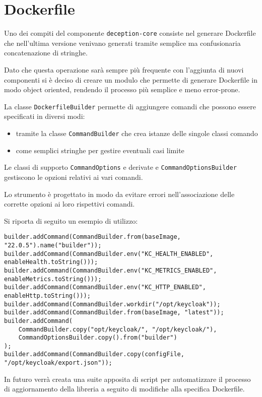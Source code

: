 \section{Dockerfile}

Uno dei compiti del componente \texttt{deception-core} consiste nel generare Dockerfile che nell'ultima versione venivano generati tramite semplice ma confusionaria concatenazione di stringhe.

Dato che questa operazione sarà sempre più frequente con l'aggiunta di nuovi componenti si è deciso di creare un modulo che permette di generare Dockerfile in modo object oriented, rendendo il processo più semplice e meno error-prone.

La classe \texttt{DockerfileBuilder} permette di aggiungere comandi che possono essere specificati in diversi modi:
\begin{itemize}
    \item tramite la classe \texttt{CommandBuilder} che crea istanze delle singole classi comando
    \item come semplici stringhe per gestire eventuali casi limite
\end{itemize}

Le classi di supporto \texttt{CommandOptions} e derivate e \texttt{CommandOptionsBuilder} gestiscono le opzioni relativi ai vari comandi.

Lo strumento è progettato in modo da evitare errori nell'associazione delle corrette opzioni ai loro rispettivi comandi.

Si riporta di seguito un esempio di utilizzo:
\begin{verbatim}
builder.addCommand(CommandBuilder.from(baseImage, "22.0.5").name("builder"));
builder.addCommand(CommandBuilder.env("KC_HEALTH_ENABLED", enableHealth.toString()));
builder.addCommand(CommandBuilder.env("KC_METRICS_ENABLED", enableMetrics.toString()));
builder.addCommand(CommandBuilder.env("KC_HTTP_ENABLED", enableHttp.toString()));
builder.addCommand(CommandBuilder.workdir("/opt/keycloak"));
builder.addCommand(CommandBuilder.from(baseImage, "latest"));
builder.addCommand(
    CommandBuilder.copy("opt/keycloak/", "/opt/keycloak/"),
    CommandOptionsBuilder.copy().from("builder")
);
builder.addCommand(CommandBuilder.copy(configFile, "/opt/keycloak/export.json"));
\end{verbatim}

In futuro verrà creata una suite apposita di script per automatizzare il processo di aggiornamento della libreria a seguito di modifiche alla specifica Dockerfile.
